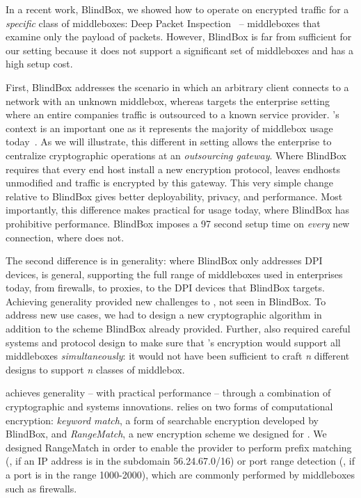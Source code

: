 In a recent work, BlindBox, we showed how to operate on encrypted traffic for a {\em specific} class of middleboxes: Deep Packet Inspection~\cite{blindbox} -- middleboxes that examine only the payload of packets. 
However, BlindBox is far from sufficient for our setting because it does not support a significant set of middleboxes  and has a high setup cost.  
 
 
First, BlindBox addresses the scenario in which an arbitrary client connects to a network with an unknown middlebox, whereas \sys targets the enterprise setting where an entire companies traffic is outsourced to a known service provider.
\sys's context is an important one as it represents the majority of middlebox usage today~\cite{need-citation}. 
As we will illustrate, this different in setting allows the enterprise to centralize cryptographic operations at an {\it outsourcing gateway}.
Where BlindBox requires that every end host install a new encryption protocol, \sys leaves endhosts unmodified and traffic is encrypted by this gateway.
This very simple change relative to BlindBox gives \sys better deployability, privacy, and performance.
Most importantly, this difference makes \sys practical for usage today, where BlindBox has prohibitive performance.
BlindBox imposes a 97 second setup time on {\it every} new connection, where \sys does not.

The second difference is in generality: where BlindBox only addresses DPI devices, \sys is general, supporting the full range of middleboxes used in enterprises today, from firewalls, to proxies, to the DPI devices that BlindBox targets.
Achieving generality provided new challenges to \sys, not seen in BlindBox. 
To address new use cases, we had to design a new cryptographic algorithm in addition to the scheme BlindBox already provided. 
Further, \sys also required careful systems and protocol design to make sure that \sys's encryption would support all middleboxes {\it simultaneously}: it would not have been sufficient to craft {\it n} different designs to support {\it n} classes of middlebox.


    \sys achieves generality -- with practical performance -- through a combination of cryptographic and systems innovations.
    \sys relies on two forms of computational encryption: {\it keyword match}, a form of searchable encryption developed by BlindBox,  and {\it RangeMatch}, a new encryption scheme we designed for \sys.
    We designed RangeMatch in order to enable the provider to perform prefix matching (\eg{}, if an IP address is in the subdomain 56.24.67.0/16) or port range detection (\eg{}, if a port is in the range 1000-2000), which are commonly performed by middleboxes such as firewalls. 

